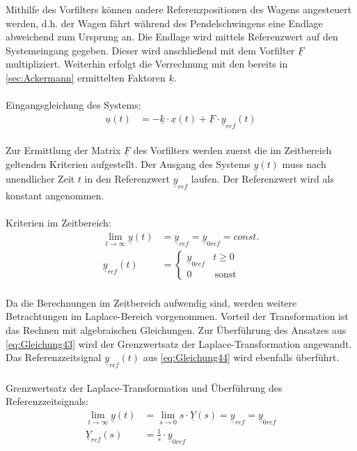 \documentclass[
	pagesize,
	fontsize=12pt,
	paper=a4,
	oneside,
   reqno
]{scrartcl}
\begin{document}
Mithilfe des Vorfilters können andere Referenzpositionen des Wagens angesteuert werden, d.h. der Wagen fährt während des Pendelschwingens eine Endlage abweichend zum Ursprung an. Die Endlage wird mittels Referenzwert auf den Systemeingang gegeben. Dieser wird anschließend mit dem Vorfilter $\underline{F}$ multipliziert. Weiterhin erfolgt die Verrechnung mit den bereits in \autoref{sec:Ackermann} ermittelten Faktoren $\underline{k}$.\\\\
Eingangsgleichung des Systems:
\begin{align}\label{eq:Gleichung42}
    \underline{u}(t) &= -\underline{k}\cdot\underline{x}(t)+\underline{F}\cdot\underline{y}_{ref}(t)
\end{align}\\
Zur Ermittlung der Matrix $\underline{F}$ des Vorfilters werden zuerst die im Zeitbereich geltenden Kriterien aufgestellt. Der Ausgang des Systems $\underline{y}(t)$ muss nach unendlicher Zeit $t$ in den Referenzwert $\underline{y}_{ref}$ laufen. Der Referenzwert wird als konstant angenommen.\\\\
Kriterien im Zeitbereich:
\begin{align}
    \lim_{t \to \infty} \underline{y}(t) &= \underline{y}_{ref} = \underline{y}_{0ref} = const. \label{eq:Gleichung43}\\
    \underline{y}_{ref}(t) &=
    \begin{cases}
        \underline{y}_{0ref} & t \geq 0 \\
        0 & \, \text{sonst}
    \end{cases} \label{eq:Gleichung44}
\end{align}\\
Da die Berechnungen im Zeitbereich aufwendig sind, werden weitere Betrachtungen im Laplace-Bereich vorgenommen. Vorteil der Transformation ist das Rechnen mit algebraischen Gleichungen. Zur Überführung des Ansatzes aus \autoref{eq:Gleichung43} wird der Grenzwertsatz der Laplace-Transformation angewandt. Das Referenzzeitsignal $\underline{y}_{ref}(t)$ aus \autoref{eq:Gleichung44} wird ebenfalls überführt.\\\\
Grenzwertsatz der Laplace-Transformation und Überführung des Referenzzeitsignals:
\begin{align}
    \lim_{t \to \infty} \underline{y}(t) &= \lim_{s \to 0} s\cdot\underline{Y}(s) = \underline{y}_{ref} = \underline{y}_{0ref} \label{eq:Gleichung45}\\
    \underline{Y}_{ref}(s) &= \frac{1}{s}\cdot\underline{y}_{0ref} \label{eq:Gleichung46}
\end{align}\\
\end{document}
